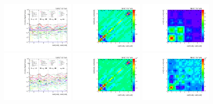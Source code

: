 \begin{figure}[htb]
\begin{center}
 \includegraphics[width=0.32\textwidth]{fig_fullRun2UL/unfolding/combined/deltaSystCombinedlog_rebinnedB_c_Mnr_mttbar.pdf}
 \includegraphics[width=0.32\textwidth]{fig_fullRun2UL/unfolding/combined/StatCovMatrix_rebinnedB_c_Mnr_mttbar.pdf}
 \includegraphics[width=0.32\textwidth]{fig_fullRun2UL/unfolding/combined/TotalSystCovMatrix_rebinnedB_c_Mnr_mttbar.pdf} \\
 \includegraphics[width=0.32\textwidth]{fig_fullRun2UL/unfolding/combined/deltaSystCombinedlogNorm_rebinnedB_c_Mnr_mttbar.pdf}
 \includegraphics[width=0.32\textwidth]{fig_fullRun2UL/unfolding/combined/StatCovMatrixNorm_rebinnedB_c_Mnr_mttbar.pdf}
 \includegraphics[width=0.32\textwidth]{fig_fullRun2UL/unfolding/combined/TotalSystCovMatrixNorm_rebinnedB_c_Mnr_mttbar.pdf} \\

\end{center}
\end{figure}
